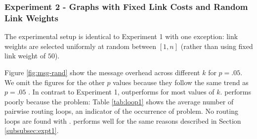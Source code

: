 



\subsubsection{Experiment 2 - \er Graphs with Fixed Link Costs and Random Link Weights}
\label{subsec:expt2}


The experimental setup is identical to Experiment 1 with one exception: link weights are selected uniformly at random between $[1,n]$ (rather than using 
fixed link weight of $50$).

Figure \ref{fig:msg-rand} show the message overhead across different $k$ for $p=.05$. We omit the figures for the other $p$ values because they follow the 
same trend as $p=.05$ \cite{Tech}.
In contrast to Experiment 1, \purge outperforms \second for most values of $k$. 
\second performs poorly because the \infinity problem: Table \ref{tab:loop1} shows the average number of pairwise routing loops, an indicator of the occurrence of \infinity problem.
No routing loops are found with \purges. \cpr performs well for the same reasons described in Section \ref{subsubsec:expt1}.  

\begin{figure*}[t]
\centering
{}
\caption{Message overhead for \er graph with link weights selected uniformly random from $[1,100]$}
\label{fig:msg-rand}
\end{figure*}


